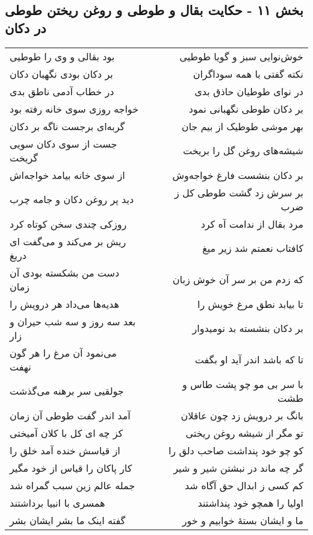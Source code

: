 \begin{center}
\section*{بخش ۱۱ - حکایت بقال و طوطی و روغن ریختن طوطی در دکان}
\label{sec:sh011}
\begin{longtable}{l p{0.5cm} r}
بود بقالی و وی را طوطیی
&&
خوش‌نوایی سبز و گویا طوطیی
\\
بر دکان بودی نگهبان دکان
&&
نکته گفتی با همه سوداگران
\\
در خطاب آدمی ناطق بدی
&&
در نوای طوطیان حاذق بدی
\\
خواجه روزی سوی خانه رفته بود
&&
بر دکان طوطی نگهبانی نمود
\\
گربه‌ای برجست ناگه بر دکان
&&
بهر موشی طوطیک از بیم جان
\\
جست از سوی دکان سویی گریخت
&&
شیشه‌های روغن گل را بریخت
\\
از سوی خانه بیامد خواجه‌اش
&&
بر دکان بنشست فارغ خواجه‌وش
\\
دید پر روغن دکان و جامه چرب
&&
بر سرش زد گشت طوطی کل ز ضرب
\\
روزکی چندی سخن کوتاه کرد
&&
مرد بقال از ندامت آه کرد
\\
ریش بر می‌کند و می‌گفت ای دریغ
&&
کافتاب نعمتم شد زیر میغ
\\
دست من بشکسته بودی آن زمان
&&
که زدم من بر سر آن خوش زبان
\\
هدیه‌ها می‌داد هر درویش را
&&
تا بیابد نطق مرغ خویش را
\\
بعد سه روز و سه شب حیران و زار
&&
بر دکان بنشسته بد نومیدوار
\\
می‌نمود آن مرغ را هر گون نهفت
&&
تا که باشد اندر آید او بگفت
\\
جولقیی سر برهنه می‌گذشت
&&
با سر بی مو چو پشت طاس و طشت
\\
آمد اندر گفت طوطی آن زمان
&&
بانگ بر درویش زد چون عاقلان
\\
کز چه ای کل با کلان آمیختی
&&
تو مگر از شیشه روغن ریختی
\\
از قیاسش خنده آمد خلق را
&&
کو چو خود پنداشت صاحب دلق را
\\
کار پاکان را قیاس از خود مگیر
&&
گر چه ماند در نبشتن شیر و شیر
\\
جمله عالم زین سبب گمراه شد
&&
کم کسی ز ابدال حق آگاه شد
\\
همسری با انبیا برداشتند
&&
اولیا را همچو خود پنداشتند
\\
گفته اینک ما بشر ایشان بشر
&&
ما و ایشان بستهٔ خوابیم و خور
\\

\end{longtable}
\end{center}
